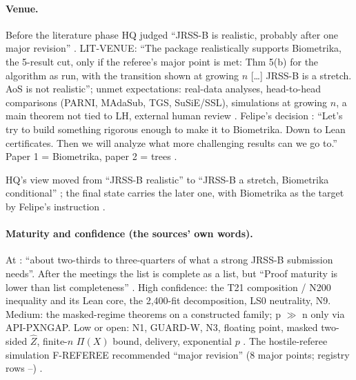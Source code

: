 \paragraph{Venue.} Before the literature phase HQ judged ``JRSS-B is realistic, probably after one major revision'' . LIT-VENUE: ``The package realistically supports Biometrika, the 5-result cut, only if the referee's major point is met: Thm 5(b) for the algorithm as run, with the transition shown at growing $n$ [\ldots] JRSS-B is a stretch. AoS is not realistic''; unmet expectations: real-data analyses, head-to-head comparisons (PARNI, MAdaSub, TGS, SuSiE/SSL), simulations at growing $n$, a main theorem not tied to LH, external human review . Felipe's decision : ``Let's try to build something rigorous enough to make it to Biometrika. Down to Lean certificates. Then we will analyze what more challenging results can we go to.'' Paper 1 = Biometrika, paper 2 = trees .
\begin{uncertain}
HQ's view moved from ``JRSS-B realistic''  to ``JRSS-B a stretch, Biometrika conditional'' ; the final state carries the later one, with Biometrika as the target by Felipe's instruction .
\end{uncertain}

\paragraph{Maturity and confidence (the sources' own words).} At : ``about two-thirds to three-quarters of what a strong JRSS-B submission needs''. After the meetings the list is complete as a list, but ``Proof maturity is lower than list completeness'' . High confidence: the T21 composition / N200 inequality and its Lean core, the 2,400-fit decomposition, LS0 neutrality, N9. Medium: the masked-regime theorems on a constructed family; p $\gg$ n only via API-PXNGAP. Low or open: N1, GUARD-W, N3, floating point, masked two-sided $\hat Z$, finite-$n$ $\Pi(X)$ bound, delivery, exponential $p$ . The hostile-referee simulation F-REFEREE recommended ``major revision'' (8 major points; registry rows --) .

